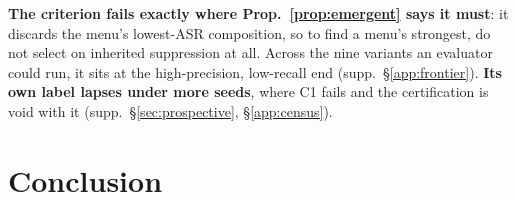 \documentclass{article}
\begin{document}
\label{sec:strategies}
\textbf{The criterion fails exactly where Prop.~\ref{prop:emergent} says it must}: it discards the menu's lowest-ASR composition, so to find a menu's strongest, do not select on inherited suppression at all. Across the nine variants an evaluator could run, it sits at the high-precision, low-recall end (supp.\ §\ref{app:frontier}). \textbf{Its own label lapses under more seeds}, where C1 fails and the certification is void with it (supp.\ §\ref{sec:prospective}, §\ref{app:census}).

\section{Conclusion}
\end{document}
